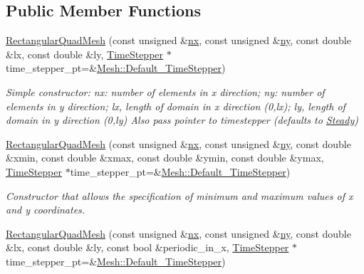 \subsection*{Public Member Functions}
\begin{DoxyCompactItemize}
\item 
\hyperlink{classoomph_1_1RectangularQuadMesh_a1f906bca42da3d44765382013667e40d}{Rectangular\+Quad\+Mesh} (const unsigned \&\hyperlink{classoomph_1_1RectangularQuadMesh_abfef93d6322886cdce14a437186e4821}{nx}, const unsigned \&\hyperlink{classoomph_1_1RectangularQuadMesh_a86d76a55eb7c4e8bca9b74d23c8b0412}{ny}, const double \&lx, const double \&ly, \hyperlink{classoomph_1_1TimeStepper}{Time\+Stepper} $\ast$time\+\_\+stepper\+\_\+pt=\&\hyperlink{classoomph_1_1Mesh_a12243d0fee2b1fcee729ee5a4777ea10}{Mesh\+::\+Default\+\_\+\+Time\+Stepper})
\begin{DoxyCompactList}\small\item\em Simple constructor\+: nx\+: number of elements in x direction; ny\+: number of elements in y direction; lx, length of domain in x direction (0,lx); ly, length of domain in y direction (0,ly) Also pass pointer to timestepper (defaults to \hyperlink{classoomph_1_1Steady}{Steady}) \end{DoxyCompactList}\item 
\hyperlink{classoomph_1_1RectangularQuadMesh_aea506679674e4fc5c43b62a53798d0be}{Rectangular\+Quad\+Mesh} (const unsigned \&\hyperlink{classoomph_1_1RectangularQuadMesh_abfef93d6322886cdce14a437186e4821}{nx}, const unsigned \&\hyperlink{classoomph_1_1RectangularQuadMesh_a86d76a55eb7c4e8bca9b74d23c8b0412}{ny}, const double \&xmin, const double \&xmax, const double \&ymin, const double \&ymax, \hyperlink{classoomph_1_1TimeStepper}{Time\+Stepper} $\ast$time\+\_\+stepper\+\_\+pt=\&\hyperlink{classoomph_1_1Mesh_a12243d0fee2b1fcee729ee5a4777ea10}{Mesh\+::\+Default\+\_\+\+Time\+Stepper})
\begin{DoxyCompactList}\small\item\em Constructor that allows the specification of minimum and maximum values of x and y coordinates. \end{DoxyCompactList}\item 
\hyperlink{classoomph_1_1RectangularQuadMesh_a40f120e00d682026e54593ca0f823535}{Rectangular\+Quad\+Mesh} (const unsigned \&\hyperlink{classoomph_1_1RectangularQuadMesh_abfef93d6322886cdce14a437186e4821}{nx}, const unsigned \&\hyperlink{classoomph_1_1RectangularQuadMesh_a86d76a55eb7c4e8bca9b74d23c8b0412}{ny}, const double \&lx, const double \&ly, const bool \&periodic\+\_\+in\+\_\+x, \hyperlink{classoomph_1_1TimeStepper}{Time\+Stepper} $\ast$time\+\_\+stepper\+\_\+pt=\&\hyperlink{classoomph_1_1Mesh_a12243d0fee2b1fcee729ee5a4777ea10}{Mesh\+::\+Default\+\_\+\+Time\+Stepper})

\end{DoxyCompactItemize}
